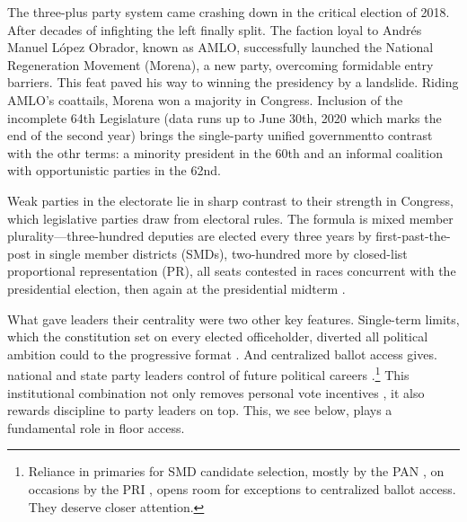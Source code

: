 \documentclass[letter,12pt]{article}
\begin{document}
The three-plus party system came crashing down in the critical election of 2018. After decades of infighting the left finally split. The faction loyal to Andrés Manuel López Obrador, known as AMLO, successfully launched the National Regeneration Movement (Morena), a new party, overcoming formidable entry barriers. This feat paved his way to winning the presidency by a landslide. Riding AMLO's coattails, Morena won a majority in Congress. Inclusion of the incomplete 64th Legislature (data runs up to June 30th, 2020 which marks the end of the second year) brings the single-party unified governmentto contrast with the othr terms: a minority president in the 60th and an informal coalition with opportunistic parties in the 62nd.


Weak parties in the electorate lie in sharp contrast to their strength in Congress, which legislative parties draw from electoral rules. The formula is mixed member plurality---three-hundred deputies are elected every three years by first-past-the-post in single member districts (SMDs), two-hundred more by closed-list proportional representation (PR), all seats contested in races concurrent with the presidential election, then again at the presidential midterm \citep{weldonMixedMemberSys2001}.

What gave leaders their centrality were two other key features. Single-term limits, which the constitution set on every elected officeholder, diverted all political ambition could to the progressive format \citep{schlesinger.1966}. And centralized ballot access gives. national and state party leaders control of future political careers \citep{langston.2008}.\footnote{Reliance in primaries for SMD candidate selection, mostly by the PAN \citep{ascencio.kerevel.cand-sel-beh.2021}, on occasions by the PRI \citep{poire.phd.2002}, opens room for exceptions to centralized ballot access. They deserve closer attention.} This institutional combination not only removes personal vote incentives \citep{carey.shugart.1995,cain.etal.1987}, it also rewards discipline to party leaders on top. This, we see below, plays a fundamental role in floor access. 
\end{document}
